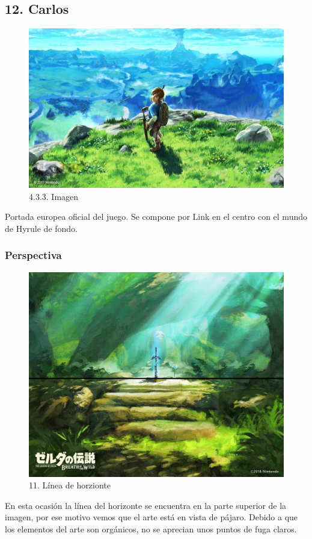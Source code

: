 \documentclass[12pt]{article}
\begin{document}
    \subsection{12. Carlos}
    \begin{figure}[H]
      \centering
      \includegraphics[scale=0.7]{images/Concepts/12_concept_art.jpg}
      \caption{\small 4.3.3. Imagen}
    \end{figure}
    Portada europea oficial del juego. Se compone por Link en el centro con el mundo de Hyrule de fondo.

            \subsubsection{Perspectiva}
            \begin{figure}[H]
      \centering
      \includegraphics[scale=0.35]{images/Carlos/12/Horizonte.jpg}
      \caption{\small 11. Línea de horzionte}
    \end{figure}
    En esta ocasión la línea del horizonte se encuentra en la parte superior de la imagen, por ese motivo vemos que el arte está en vista de pájaro. Debido a que los elementos del arte son orgánicos, no se aprecian unos puntos de fuga claros.
\end{document}

